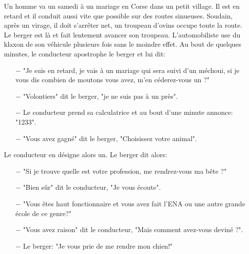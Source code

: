 \begin{center}\underline{\hspace{5 cm}}\end{center}

Un homme va un samedi à un mariage en Corse dans un petit village. Il est en retard et il conduit aussi vite que possible sur des routes sinueuses. Soudain, après un virage, il doit s'arrêter net, un troupeau d'ovins occupe toute la route. Le berger est là et fait lentement avancer son troupeau. L'automobiliste use du klaxon de son véhicule plusieurs fois sans le moindre effet. Au bout de quelques minutes, le conducteur apostrophe le berger et lui dit:
\begin{itemize}
	\item[$-$] "Je suis en retard, je vais à un mariage qui sera suivi d'un méchoui, si je vous dis combien de moutons vous avez, m'en céderez-vous un ?"

	\item[$-$] "Volontiers" dit le berger, "je ne suis pas à un près".  

	\item[$-$] Le conducteur prend sa calculatrice et au bout d'une minute annonce: "1233".

	\item[$-$]  "Vous avez gagné" dit le berger, "Choisissez votre animal".
\end{itemize}
Le conducteur en désigne alors un. Le berger dit alors:
\begin{itemize}
	\item[$-$] "Si je trouve quelle est votre profession, me rendrez-vous ma bête ?"

	\item[$-$] "Bien sûr" dit le conducteur, "Je vous écoute".

	\item[$-$] "Vous êtes haut fonctionnaire et vous avez fait l'ENA ou une autre grande école de ce genre?"

	\item[$-$] "Vous avez raison" dit le conducteur, "Mais comment avez-vous deviné ?".

	\item[$-$] Le berger: "Je vous prie de me rendre mon chien!"
\end{itemize}

\begin{center}\underline{\hspace{5 cm}}\end{center}

